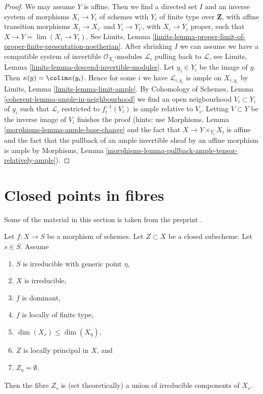 \begin{proof}
We may assume $Y$ is affine. Then we find a directed set $I$
and an inverse system of morphisms $X_i \to Y_i$ of schemes
with $Y_i$ of finite type over $\mathbf{Z}$, with affine
transition morphisms $X_i \to X_{i'}$ and $Y_i \to Y_{i'}$,
with $X_i \to Y_i$ proper, such that $X \to Y = \lim (X_i \to Y_i)$.
See Limits, Lemma
\ref{limits-lemma-proper-limit-of-proper-finite-presentation-noetherian}.
After shrinking $I$ we can assume we have a compatible system of
invertible $\mathcal{O}_{X_i}$-modules $\mathcal{L}_i$
pulling back to $\mathcal{L}$, see
Limits, Lemma \ref{limits-lemma-descend-invertible-modules}.
Let $y_i \in Y_i$ be the image of $y$.
Then $\kappa(y) = \colim \kappa(y_i)$.
Hence for some $i$ we have $\mathcal{L}_{i, y_i}$
is ample on $X_{i, y_i}$ by
Limits, Lemma \ref{limits-lemma-limit-ample}.
By Cohomology of Schemes, Lemma \ref{coherent-lemma-ample-in-neighbourhood}
we find an open neigbourhood
$V_i \subset Y_i$ of $y_i$ such that
$\mathcal{L}_i$ restricted to $f_i^{-1}(V_i)$
is ample relative to $V_i$.
Letting $V \subset Y$ be the inverse image of
$V_i$ finishes the proof (hints: use
Morphisms, Lemma \ref{morphisms-lemma-ample-base-change} and
the fact that $X \to Y \times_{Y_i} X_i$ is affine
and the fact that the pullback of an
ample invertible sheaf by an affine morphism is ample by
Morphisms, Lemma \ref{morphisms-lemma-pullback-ample-tensor-relatively-ample}).
\end{proof}











\section{Closed points in fibres}
\label{section-closed-points-fibres}

\noindent
Some of the material in this section is taken from the preprint
\cite{Osserman-Payne}.

\begin{lemma}
\label{lemma-locally-principal-vertical}
Let $f : X \to S$ be a morphism of schemes.
Let $Z \subset X$ be a closed subscheme.
Let $s \in S$.
Assume
\begin{enumerate}
\item $S$ is irreducible with generic point $\eta$,
\item $X$ is irreducible,
\item $f$ is dominant,
\item $f$ is locally of finite type,
\item $\dim(X_s) \leq \dim(X_\eta)$,
\item $Z$ is locally principal in $X$, and
\item $Z_\eta = \emptyset$.
\end{enumerate}
Then the fibre $Z_s$ is (set theoretically) a union of
irreducible components of $X_s$.
\end{lemma}

